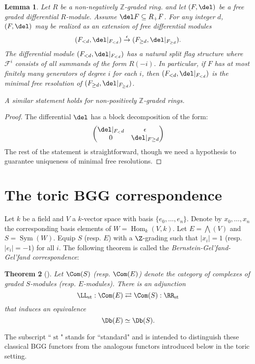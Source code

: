 \documentclass[12pt]{amsart}
\newtheorem{lemma}{Lemma}[section]
\newtheorem{thm}[lemma]{Theorem}
\theoremstyle{definition}
\theoremstyle{remark}
\newcommand{\ZZ}{\mathbb Z}
\newcommand{\Hom}{\operatorname{Hom}} %
\newcommand{\Sym}{\operatorname{Sym}} %
\def\on{\operatorname}
\begin{document}
\begin{lemma}\label{lem:ZZ to flag}
Let $R$ be a non-negatively $\ZZ$-graded ring. and let $(F,\del)$ be a free graded differential $R$-module.  Assume $\del F\subseteq R_+F$.  For any integer $d$, $(F,\del)$ may be realized as an extension of free differential modules
\[
(F_{<d}, \del|_{F_{<d}}) \overset{\epsilon}{\to} (F_{\geq d}, \del|_{F_{\geq d}}).
\]
The differential module $(F_{<d}, \del|_{F_{<d}}) $ has a natural split flag structure where $\mathcal F^i$ consists of all summands of the form $R(-i)$.  In particular, if $F$ has at most finitely many generators of degree $i$ for each $i$, then $(F_{<d}, \del|_{F_{<d}}) $ is the minimal free resolution of $ (F_{\geq d}, \del|_{F_{\geq d}})$.

A similar statement holds for non-positively $\ZZ$-graded rings.
\end{lemma}
\begin{proof}
The differential $\del$ has a block decomposition of the form:
\[
\begin{pmatrix}
\del|_{F_<d} & \epsilon\\
0 & \del|_{F\geq d}
\end{pmatrix}
\]
The rest of the statement is straightforward, though we need a hypothesis to guarantee uniqueness of minimal free resolutions.
\end{proof}
\section{The toric BGG correspondence}

Let $k$ be a field and $V$ a $k$-vector space with basis $\{e_0, \dots, e_n\}$. Denote by $x_0, \dots, x_n$ the corresponding basis elements of $W = \Hom_k(V, k)$. Let $E = \bigwedge(V)$ and $S = \Sym(W)$. Equip $S$ (resp. $E$) with a $\Z$-grading such that $|x_i| = 1$ (resp. $|e_i| = -1$) for all $i$. The following theorem is called the \emph{Bernstein-Gel'fand-Gel'fand correspondence}:

\begin{thm}[\cite{BGG}] 
Let $\Com(S)$ (resp. $\Com(E)$) denote the category of complexes of graded $S$-modules (resp. $E$-modules). There is an adjunction 
$$
\LL_{\on{st}} : \Com(E) \rightleftarrows \Com(S) : \RR_{\on{st}} 
$$
that induces an equivalence
$$
\Db(E) \simeq \Db(S).
$$
\end{thm}
The subscript ``$\on{st}$" stands for ``standard" and is intended to distinguish these classical BGG functors from the analogous functors introduced below in the toric setting.
\end{document}
